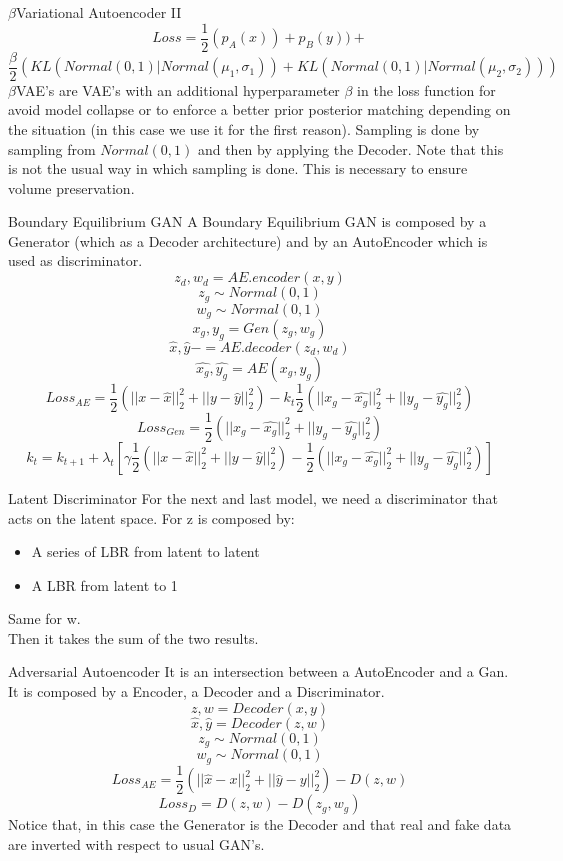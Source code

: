 \documentclass{beamer}
\begin{document}
\begin{frame}{$\beta$Variational Autoencoder II}
$$Loss=\frac{1}{2}(p_{A}(x))+p_{B}(y))+$$ $$\frac{\beta}{2}(KL(Normal(0,1)|Normal(\mu_{1},\sigma_{1}))+KL(Normal(0,1)|Normal(\mu_{2},\sigma_{2})))$$
$\beta$VAE's are VAE's with an additional hyperparameter $\beta$ in the loss function for avoid model collapse or to enforce a better prior posterior matching depending on the situation (in this case we use it for the first reason).
Sampling is done by sampling from $Normal(0,1)$  and then by applying the Decoder. Note that this is not the usual way in which sampling is done. This is necessary to ensure volume preservation.
\end{frame}
\begin{frame}{Boundary Equilibrium GAN}
A Boundary Equilibrium GAN is composed by a Generator (which as a Decoder architecture) and by an AutoEncoder which is used as discriminator. 
$$ z_{d},w_{d}=AE.encoder(x,y)$$
$$z_{g}\sim Normal(0,1)$$
$$w_{g}\sim Normal(0,1)$$
$$x_{g},y_{g}=Gen(z_{g},w_{g})$$
$$\hat{x},\hat{y}-=AE.decoder(z_{d},w_{d})$$
$$\hat{x_{g}},\hat{y_{g}}=AE(x_{g},y_{g})$$
$$Loss_{AE}=\frac{1}{2}(||x-\hat{x}||_{2}^{2}+||y-\hat{y}||_{2}^{2})-k_{t}\frac{1}{2}(||x_{g}-\hat{x_{g}}||_{2}^{2}+||y_{g}-\hat{y_{g}}||_{2}^{2})$$
$$Loss_{Gen}=\frac{1}{2}(||x_{g}-\hat{x_{g}}||_{2}^{2}+||y_{g}-\hat{y_{g}}||_{2}^{2})$$
$$k_{t}=k_{t+1}+\lambda_{t}[\gamma\frac{1}{2}(||x-\hat{x}||_{2}^{2}+||y-\hat{y}||_{2}^{2})-\frac{1}{2}(||x_{g}-\hat{x_{g}}||_{2}^{2}+||y_{g}-\hat{y_{g}}||_{2}^{2})]$$
\end{frame}
\begin{frame}{Latent Discriminator}
For the next and last model, we need a discriminator that acts on the latent space. For z is composed by:
\begin{itemize}
\item A series of LBR from latent to latent
\item A LBR from latent to 1 
\end{itemize}
Same for w.\\
Then it takes the sum of the two results.
\end{frame}
\begin{frame}{Adversarial Autoencoder}
It is an intersection between a AutoEncoder and a Gan. It is composed by a Encoder, a Decoder and a Discriminator.
$$z,w=Decoder(x,y)$$
$$\hat{x},\hat{y}=Decoder(z,w)$$
$$z_{g}\sim Normal(0,1)$$
$$w_{g}\sim Normal(0,1)$$
$$Loss_{AE}=\frac{1}{2}(||\hat{x}-x||_{2}^{2}+||\hat{y}-y||_{2}^{2})-D(z,w)$$
$$Loss_{D}=D(z,w)-D(z_{g},w_{g})$$
Notice that, in this case the Generator is the Decoder and that real and fake data are inverted with respect to usual GAN's.
\end{frame}
\end{document}
